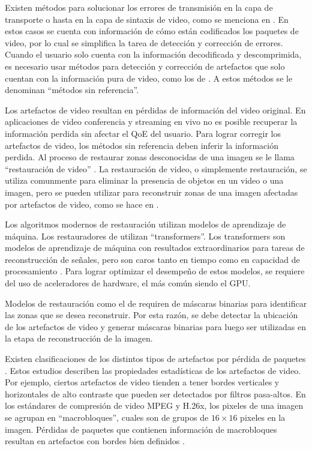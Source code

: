 Existen métodos para solucionar los errores de transmisión en la capa de transporte o hasta en la capa de sintaxis de video, como se menciona en \cite{Sanyal2021}.
En estos casos se cuenta con información de cómo están codificados los paquetes de video, por lo cual se simplifica la tarea de detección y corrección de errores.
Cuando el usuario solo cuenta con la información decodificada y descomprimida, es necesario usar métodos para detección y corrección de artefactos que solo cuentan con la información pura de video, como los de \cite{Vranjes2018, Sanyal2021,Goodall2019}.
A estos métodos se le denominan ``métodos sin referencia''.

Los artefactos de video resultan en pérdidas de información del video original. En aplicaciones de video conferencia y streaming en vivo no es posible recuperar la información perdida sin afectar el QoE del usuario.
Para lograr corregir los artefactos de video, los métodos sin referencia deben inferir la información perdida.
Al proceso de restaurar zonas desconocidas de una imagen se le llama ``restauración de video'' \cite{Li2022, Zhou2021}.
La restauración de video, o simplemente restauración, se utiliza comunmente para eliminar la presencia de objetos en un video o una imagen, pero se pueden utilizar para reconstruir zonas de una imagen afectadas por artefactos de video, como se hace en \cite{Dong2023, Brenes2022}.

Los algoritmos modernos de restauración utilizan modelos de aprendizaje de máquina.
Los restauradores de \cite{Li2022, Zhou2021, Liu2021} utilizan ``transformers''.
Los transformers son modelos de aprendizaje de máquina con resultados extraordinarios para tareas de reconstrucción de señales, pero son caros tanto en tiempo como en capacidad de procesamiento \cite{Liu2021}.
Para lograr optimizar el desempeño de estos modelos, se requiere del uso de aceleradores de hardware, el más común siendo el GPU.

Modelos de restauración como el de \cite{Li2022} requiren de máscaras binarias para identificar las zonas que se desea reconstruir.
Por esta razón, se debe detectar la ubicación de los artefactos de video y generar máscaras binarias para luego ser utilizadas en la etapa de reconstrucción de la imagen.

Existen clasificaciones de los distintos tipos de artefactos por pérdida de paquetes \cite{Greengrass2009, Glavota2016}. Estos estudios describen las propiedades estadísticas de los artefactos de video. Por ejemplo, ciertos artefactos de video tienden a tener bordes verticales y horizontales de alto contraste que pueden ser detectados por filtros pasa-altos. En los estándares de compresión de video MPEG y H.26x, los pixeles de una imagen se agrupan en ``macrobloques'', cuales son de grupos de $16 \times 16$ pixeles en la imagen. Pérdidas de paquetes que contienen información de macrobloques resultan en artefactos con bordes bien definidos \cite{Vranjes2019, Glavota2018}.

